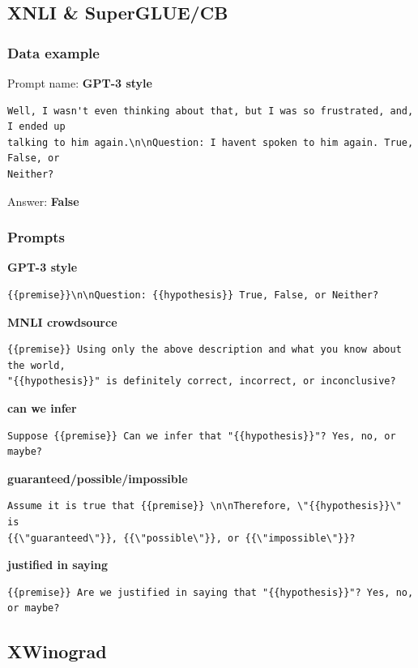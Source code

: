 \documentclass[twoside,11pt]{article}
\begin{document}
\subsection{XNLI \& SuperGLUE/CB}

\subsubsection{Data example}

Prompt name: \noindent\textbf{GPT-3 style}
\begin{verbatim}
Well, I wasn't even thinking about that, but I was so frustrated, and, I ended up 
talking to him again.\n\nQuestion: I havent spoken to him again. True, False, or
Neither?
\end{verbatim}
Answer: \textbf{False}

\subsubsection{Prompts}
\noindent\textbf{GPT-3 style}
\begin{verbatim}
{{premise}}\n\nQuestion: {{hypothesis}} True, False, or Neither?
\end{verbatim}

\noindent\textbf{MNLI crowdsource}
\begin{verbatim}
{{premise}} Using only the above description and what you know about the world, 
"{{hypothesis}}" is definitely correct, incorrect, or inconclusive?
\end{verbatim}

\noindent\textbf{can we infer}
\begin{verbatim}
Suppose {{premise}} Can we infer that "{{hypothesis}}"? Yes, no, or maybe?
\end{verbatim}

\noindent\textbf{guaranteed/possible/impossible}
\begin{verbatim}
Assume it is true that {{premise}} \n\nTherefore, \"{{hypothesis}}\" is 
{{\"guaranteed\"}}, {{\"possible\"}}, or {{\"impossible\"}}?
\end{verbatim}

\noindent\textbf{justified in saying}
\begin{verbatim}
{{premise}} Are we justified in saying that "{{hypothesis}}"? Yes, no, 
or maybe?
\end{verbatim}

\subsection{XWinograd}
\end{document}
